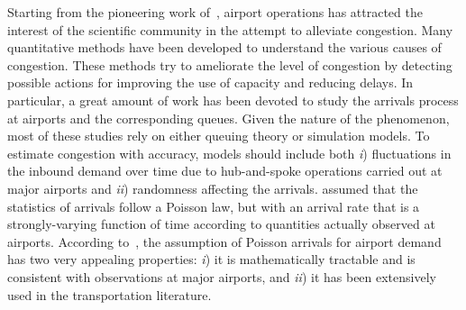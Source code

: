 \documentclass[final,review]{elsarticle}
\begin{document}
Starting from the pioneering work of~\citet{Blum1959}, airport operations has attracted the interest of the scientific community in the attempt to alleviate congestion.
Many quantitative methods have been developed to understand the various causes of congestion.
These methods try to ameliorate the level of congestion by detecting possible actions for improving the use of capacity and reducing delays.
In particular, a great amount of work has been devoted to study the arrivals process at airports and the corresponding queues.
Given the nature of the phenomenon, most of these studies rely on either queuing theory or simulation models. To  estimate congestion with accuracy, models should include both \emph{i}) fluctuations in the inbound demand over time due to hub-and-spoke operations carried out at major airports and \emph{ii}) randomness affecting the arrivals. \citeauthor{Koop1972} assumed that the statistics of arrivals follow a Poisson law, but with an arrival rate that is a strongly-varying function of time according to quantities actually observed at airports.
According to~\citet{HO1975}, the assumption of Poisson arrivals for airport demand has two very appealing properties:
\emph{i}) it is mathematically tractable and is consistent with observations at major airports, and
\emph{ii}) it has been extensively used in the transportation literature.
\end{document}
